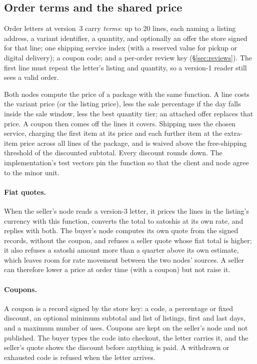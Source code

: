 \subsection{Order terms and the shared price}

Order letters at version~3 carry \emph{terms}: up to 20 lines, each naming a listing address, a variant identifier, a quantity, and optionally an offer the store signed for that line; one shipping service index (with a reserved value for pickup or digital delivery); a coupon code; and a per-order review key (\S\ref{sec:reviews}). The first line must repeat the letter's listing and quantity, so a version-1 reader still sees a valid order.

Both nodes compute the price of a package with the same function. A line costs the variant price (or the listing price), less the sale percentage if the day falls inside the sale window, less the best quantity tier; an attached offer replaces that price. A coupon then comes off the lines it covers. Shipping uses the chosen service, charging the first item at its price and each further item at the extra-item price across all lines of the package, and is waived above the free-shipping threshold of the discounted subtotal. Every discount rounds down. The implementation's test vectors pin the function so that the client and node agree to the minor unit.

\paragraph{Fiat quotes.} When the seller's node reads a version-3 letter, it prices the lines in the listing's currency with this function, converts the total to satoshis at its own rate, and replies with both. The buyer's node computes its own quote from the signed records, without the coupon, and refuses a seller quote whose fiat total is higher; it also refuses a satoshi amount more than a quarter above its own estimate, which leaves room for rate movement between the two nodes' sources. A seller can therefore lower a price at order time (with a coupon) but not raise it.

\paragraph{Coupons.} A coupon is a record signed by the store key: a code, a percentage or fixed discount, an optional minimum subtotal and list of listings, first and last days, and a maximum number of uses. Coupons are kept on the seller's node and not published. The buyer types the code into checkout, the letter carries it, and the seller's quote shows the discount before anything is paid. A withdrawn or exhausted code is refused when the letter arrives.

